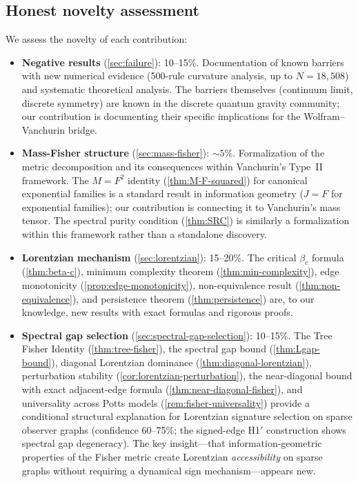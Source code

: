 \documentclass[11pt]{article}
\theoremstyle{definition}
\theoremstyle{remark}
\begin{document}
\subsection{Honest novelty assessment}
\label{sec:novelty}

We assess the novelty of each contribution:

\begin{itemize}
\item \textbf{Negative results} (\cref{sec:failure}): 10--15\%.
  Documentation of known barriers with new numerical evidence
  (500-rule curvature analysis, up to $N = 18{,}508$) and systematic
  theoretical analysis.
  The barriers themselves (continuum limit, discrete symmetry) are
  known in the discrete quantum gravity community; our contribution
  is documenting their specific implications for the Wolfram--Vanchurin
  bridge.

\item \textbf{Mass-Fisher structure} (\cref{sec:mass-fisher}): $\sim 5\%$.
  Formalization of the metric decomposition and its consequences within
  Vanchurin's Type~II framework.
  The $M = F^2$ identity (\cref{thm:M-F-squared}) for canonical
  exponential families is a standard result in information geometry
  ($J = F$ for exponential families); our contribution is connecting
  it to Vanchurin's mass tensor.
  The spectral purity condition (\cref{thm:SRC}) is similarly a
  formalization within this framework rather than a standalone
  discovery.

\item \textbf{Lorentzian mechanism} (\cref{sec:lorentzian}): 15--20\%.
  The critical $\beta_c$ formula (\cref{thm:beta-c}), minimum complexity
  theorem (\cref{thm:min-complexity}), edge monotonicity
  (\cref{prop:edge-monotonicity}), non-equivalence result
  (\cref{thm:non-equivalence}), and persistence theorem
  (\cref{thm:persistence}) are, to our knowledge, new results with
  exact formulas and rigorous proofs.

\item \textbf{Spectral gap selection} (\cref{sec:spectral-gap-selection}):
  10--15\%.
  The Tree Fisher Identity (\cref{thm:tree-fisher}), the spectral gap
  bound (\cref{thm:Lgap-bound}), diagonal Lorentzian dominance
  (\cref{thm:diagonal-lorentzian}), perturbation stability
  (\cref{cor:lorentzian-perturbation}), the near-diagonal bound with
  exact adjacent-edge formula (\cref{thm:near-diagonal-fisher}), and
  universality across Potts models
  (\cref{rem:fisher-universality}) provide a conditional structural
  explanation for Lorentzian signature selection on sparse observer
  graphs (confidence 60--75\%; the signed-edge H1$'$ construction
  shows spectral gap degeneracy).
  The key insight---that information-geometric properties of the Fisher
  metric create Lorentzian \emph{accessibility} on sparse graphs without
  requiring a dynamical sign mechanism---appears new.


\end{itemize}
\end{document}
